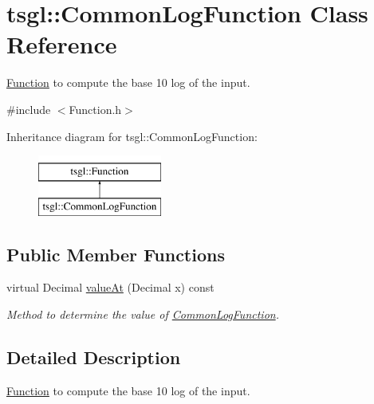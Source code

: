 \hypertarget{classtsgl_1_1_common_log_function}{\section{tsgl\-:\-:Common\-Log\-Function Class Reference}
\label{classtsgl_1_1_common_log_function}
}


\hyperlink{classtsgl_1_1_function}{Function} to compute the base 10 log of the input.  




{\ttfamily \#include $<$Function.\-h$>$}

Inheritance diagram for tsgl\-:\-:Common\-Log\-Function\-:\begin{figure}[H]
\begin{center}
\leavevmode
\includegraphics[height=2.000000cm]{classtsgl_1_1_common_log_function}
\end{center}
\end{figure}
\subsection*{Public Member Functions}
\begin{DoxyCompactItemize}
\item 
virtual Decimal \hyperlink{classtsgl_1_1_common_log_function_ac320c0f57c0fc4801bf8eb85f07838d8}{value\-At} (Decimal x) const 
\begin{DoxyCompactList}\small\item\em Method to determine the value of \hyperlink{classtsgl_1_1_common_log_function}{Common\-Log\-Function}. \end{DoxyCompactList}\end{DoxyCompactItemize}


\subsection{Detailed Description}
\hyperlink{classtsgl_1_1_function}{Function} to compute the base 10 log of the input. 

